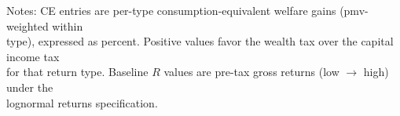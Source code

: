 
\begin{table}[!htbp]
\centering
\caption{Per-Type Welfare Gain and Baseline Return (WT vs CIT, Lognormal Returns)}
\label{tab:ce_per_type_wt_vs_cit_lognorm}
\begin{threeparttable}

\begin{minipage}{\linewidth}
\centering
{} %
\end{minipage}

\begin{tablenotes}[flushleft]
\footnotesize
\item Notes: CE entries are per-type consumption-equivalent welfare gains (pmv-weighted within \\
  type), expressed as percent. Positive values favor the wealth tax over the capital income tax \\
  for that return type. Baseline $R$ values are pre-tax gross returns (low $\rightarrow$ high)
  under the \\ lognormal returns specification.
\end{tablenotes}
\end{threeparttable}
\end{table}
